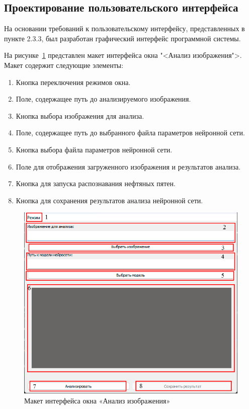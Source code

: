 \subsection{Проектирование пользовательского интерфейса}

На основании требований к пользовательскому интерфейсу, представленных в пункте 2.3.3, был разработан графический интерфейс программной системы\cite{mueller_brockmann}. 

На рисунке~\ref{fig:uianalysis} представлен макет интерфейса окна "<Анализ изображения">. Макет содержит следующие элементы:

\begin{enumerate}
	\item Кнопка переключения режимов окна.
	\item Поле, содержащее путь до анализируемого изображения.
	\item Кнопка выбора изображения для анализа.
	\item Поле, содержащее путь до выбранного файла параметров нейронной сети.
	\item Кнопка выбора файла параметров нейронной сети.
	\item Поле для отображения загруженного изображения и результатов анализа.
	\item Кнопка для запуска распознавания нефтяных пятен. 
	\item Кнопка для сохранения результатов анализа нейронной сети.
\end{enumerate}

\begin{figure}[H]
	\centering
	\includegraphics[width=0.7\linewidth]{images/ui_analysis}
	\caption{Макет интерфейса окна «Анализ изображения»}
	\label{fig:uianalysis}
\end{figure}


